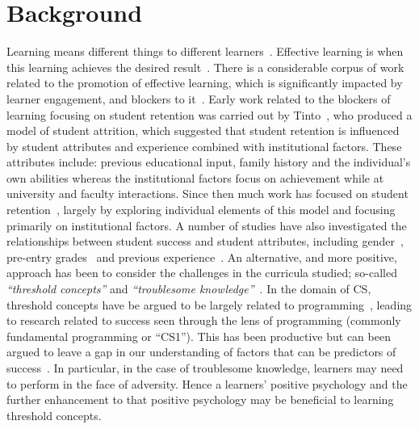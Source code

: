 \documentclass[sigconf]{acmart}
\begin{document}
\section {Background}
Learning means different things to different learners~\cite{saljo1979learning, Ramsden1992}. Effective learning is when this learning achieves the desired result~\cite{kolb2014}. There is a considerable corpus of work related to the promotion of effective learning, which is significantly impacted by learner engagement, and blockers to it~\cite{kolb2014, Ramsden1992}. Early work related to the blockers of learning focusing on student retention was carried out by Tinto~\cite{Tinto1975}, who produced a model of student attrition, which suggested that student retention is influenced by student attributes and experience combined with institutional factors. These attributes include: previous educational input, family history and the individual's own abilities whereas the institutional factors focus on achievement while at university and faculty interactions. Since then much work has focused on student retention~\cite{Barbera2017,Chen2012}, largely by exploring individual elements of this model and focusing primarily on institutional factors. A number of studies have also investigated the relationships between student success and student attributes, including gender~\cite{Lishinski:2016:LPG:2960310.2960329}, pre-entry grades~\cite{Peterson1979} and previous experience~\cite{Ramalingam:2004:SMM:1026487.1008042}. An alternative, and more positive, approach has been to consider the challenges in the curricula studied; so-called {\em``threshold concepts''} and {\em``troublesome knowledge''}~\cite{Land2012}. In the domain of CS, threshold concepts have be argued to be largely related to programming~\cite{Sanders:2016:TCC:2999541.2999546}, leading to research related to success seen through the lens of programming (commonly fundamental programming or ``CS1''). This has been productive but can been argued to leave a gap in our understanding of factors that can be predictors of success~\cite{Liao:2019:RML:3308443.3277569,Castro-Wunsch:2017:ENN:3017680.3017792,Quille:2018:PPS:3197091.3197101}. In particular, in the case of troublesome knowledge, learners may need to perform in the face of adversity. Hence a learners' positive psychology and the further enhancement to that positive psychology may be beneficial to learning threshold concepts.
\end{document}
